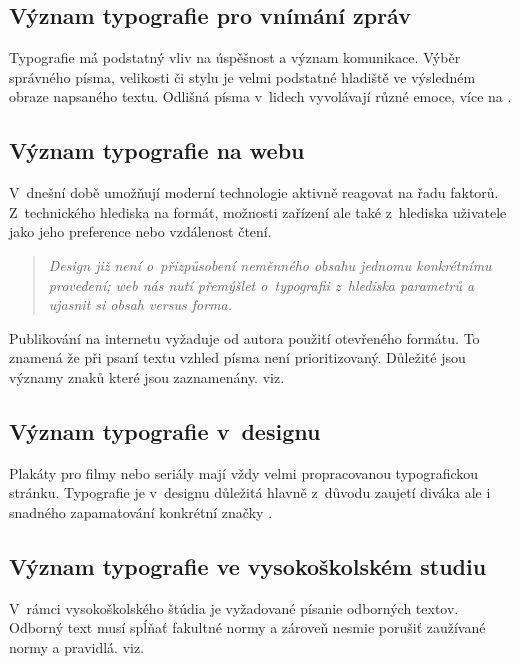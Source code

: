 \documentclass[a4paper, 11pt]{article}
\begin{document}
\subsection{Význam typografie pro vnímání zpráv}
Typografie má podstatný vliv na úspěšnost a význam komunikace. Výběr správného písma, velikosti či stylu je velmi podstatné hladiště ve výsledném obraze napsaného textu.
Odlišná písma v~lidech vyvolávají různé emoce, více na \cite{pilka}.

\subsection{Význam typografie na webu}
V~dnešní době umožňují moderní technologie aktivně reagovat na řadu faktorů. Z~technického hlediska na formát, možnosti zařízení ale také z~hlediska uživatele jako jeho preference nebo vzdálenost čtení.
\begin{quotation}
    \textit{Design již není o~přizpůsobení neměnného obsahu jednomu konkrétnímu provedení; web nás nutí přemýšlet o~typografii z~hlediska parametrů a ujasnit si obsah versus forma.}\cite{indra}
\end{quotation}
Publikování na internetu vyžaduje od autora použití otevřeného formátu. To znamená že při psaní textu vzhled písma není prioritizovaný. Důležité jsou významy znaků které jsou zaznamenány. viz. \cite{janak}

\subsection{Význam typografie v~designu}
Plakáty pro filmy nebo seriály mají vždy velmi propracovanou typografickou stránku. Typografie je v~designu důležitá hlavně z~důvodu zaujetí diváka ale i snadného zapamatování konkrétní značky \cite{gondar}.

\subsection{Význam typografie ve vysokoškolském studiu}
V~rámci vysokoškolského štúdia je vyžadované písanie odborných textov. Odborný text musí spĺňať fakultné normy a zároveň nesmie porušiť zaužívané normy a pravidlá. viz. \cite{knytl}




\pagebreak


\end{document}
